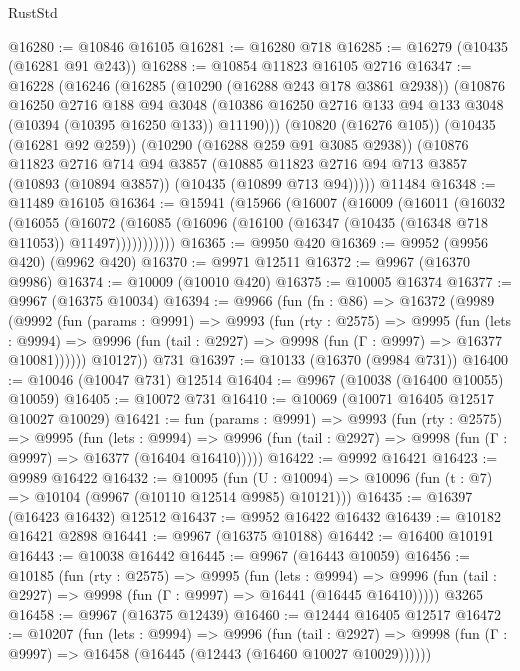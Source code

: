 \begin{lexlean}{RustStd}
\begin{coremodule}
@16280 := @10846 @16105
@16281 := @16280 @718
@16285 := @16279 (@10435 (@16281 @91 @243))
@16288 := @10854 @11823 @16105 @2716
@16347 := @16228
    (@16246
      (@16285
        (@10290 (@16288 @243 @178 @3861 @2938))
        (@10876
          @16250
          @2716
          @188
          @94
          @3048
          (@10386 @16250 @2716 @133 @94 @133 @3048 (@10394 (@10395 @16250 @133)) @11190)))
      (@10820 (@16276 @105))
      (@10435 (@16281 @92 @259))
      (@10290 (@16288 @259 @91 @3085 @2938))
      (@10876
        @11823
        @2716
        @714
        @94
        @3857
        (@10885 @11823 @2716 @94 @713 @3857 (@10893 (@10894 @3857)) (@10435 (@10899 @713 @94)))))
    @11484
@16348 := @11489 @16105
@16364 := @15941
    (@15966
      (@16007
        (@16009
          (@16011
            (@16032
              (@16055
                (@16072
                  (@16085 (@16096 (@16100 (@16347 (@10435 (@16348 @718 @11053)) @11497)))))))))))
@16365 := @9950 @420
@16369 := @9952 (@9956 @420) (@9962 @420)
@16370 := @9971 @12511
@16372 := @9967 (@16370 @9986)
@16374 := @10009 (@10010 @420)
@16375 := @10005 @16374
@16377 := @9967 (@16375 @10034)
@16394 := @9966
    (fun (fn : @86) =>
    @16372
      (@9989
        (@9992
          (fun (params : @9991) =>
          @9993
            (fun (rty : @2575) =>
            @9995
              (fun (lets : @9994) =>
              @9996 (fun (tail : @2927) => @9998 (fun (Γ : @9997) => @16377 @10081))))))
        @10127))
    @731
@16397 := @10133 (@16370 (@9984 @731))
@16400 := @10046 (@10047 @731) @12514
@16404 := @9967 (@10038 (@16400 @10055) @10059)
@16405 := @10072 @731
@16410 := @10069 (@10071 @16405 @12517 @10027 @10029)
@16421 := fun (params : @9991) =>
  @9993
    (fun (rty : @2575) =>
    @9995
      (fun (lets : @9994) =>
      @9996 (fun (tail : @2927) => @9998 (fun (Γ : @9997) => @16377 (@16404 @16410)))))
@16422 := @9992 @16421
@16423 := @9989 @16422
@16432 := @10095
    (fun (U : @10094) => @10096 (fun (t : @7) => @10104 (@9967 (@10110 @12514 @9985) @10121)))
@16435 := @16397 (@16423 @16432) @12512
@16437 := @9952 @16422 @16432
@16439 := @10182 @16421 @2898
@16441 := @9967 (@16375 @10188)
@16442 := @16400 @10191
@16443 := @10038 @16442
@16445 := @9967 (@16443 @10059)
@16456 := @10185
    (fun (rty : @2575) =>
    @9995
      (fun (lets : @9994) =>
      @9996 (fun (tail : @2927) => @9998 (fun (Γ : @9997) => @16441 (@16445 @16410)))))
    @3265
@16458 := @9967 (@16375 @12439)
@16460 := @12444 @16405 @12517
@16472 := @10207
    (fun (lets : @9994) =>
    @9996
      (fun (tail : @2927) =>
      @9998 (fun (Γ : @9997) => @16458 (@16445 (@12443 (@16460 @10027 @10029))))))

\end{coremodule}
\end{lexlean}
